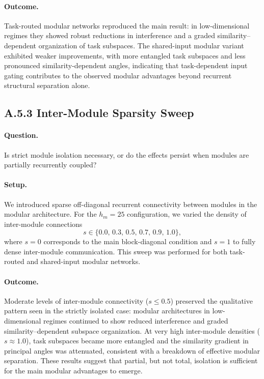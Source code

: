 \documentclass{article}
\theoremstyle{plain}
\theoremstyle{definition}
\theoremstyle{remark}
\begin{document}
\paragraph{Outcome.}
Task-routed modular networks reproduced the main result: in low-dimensional regimes they showed robust reductions in interference and a graded similarity–dependent organization of task subspaces. The shared-input modular variant exhibited weaker improvements, with more entangled task subspaces and less pronounced similarity-dependent angles, indicating that task-dependent input gating contributes to the observed modular advantages beyond recurrent structural separation alone.

\subsection{A.5.3 Inter-Module Sparsity Sweep}

\paragraph{Question.}
Is strict module isolation necessary, or do the effects persist when modules are partially recurrently coupled?

\paragraph{Setup.}
We introduced sparse off-diagonal recurrent connectivity between modules in the modular architecture.
For the $h_m = 25$ configuration, we varied the density of inter-module connections
\[
s \in \{0.0,\, 0.3,\, 0.5,\, 0.7,\, 0.9,\, 1.0\},
\]
where $s=0$ corresponds to the main block-diagonal condition and $s=1$ to fully dense inter-module communication.
This sweep was performed for both task-routed and shared-input modular networks.

\paragraph{Outcome.}
Moderate levels of inter-module connectivity ($s \leq 0.5$) preserved the qualitative pattern seen in the strictly isolated case: modular architectures in low-dimensional regimes continued to show reduced interference and graded similarity–dependent subspace organization. At very high inter-module densities ($s \approx 1.0$), task subspaces became more entangled and the similarity gradient in principal angles was attenuated, consistent with a breakdown of effective modular separation. These results suggest that partial, but not total, isolation is sufficient for the main modular advantages to emerge.
\end{document}
